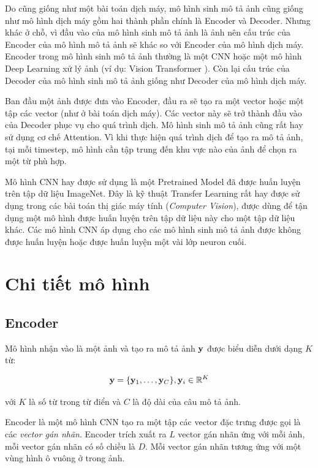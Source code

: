 \documentclass[14pt, a4paper]{article}
\numberwithin{equation}{section}
\numberwithin{algorithm}{section}
\numberwithin{figure}{section}
\numberwithin{table}{section}
\numberwithin{dl}{section}
\numberwithin{md}{section}
\numberwithin{bd}{section}
\numberwithin{dn}{section}
\numberwithin{hq}{section}
\begin{document}
    Do cũng giống như một bài toán dịch máy, mô hình sinh mô tả ảnh cũng giống như mô hình dịch máy gồm hai thành phần chính là Encoder và Decoder.
    Nhưng khác ở chỗ, vì đầu vào của mô hình sinh mô tả ảnh là ảnh nên cấu trúc của Encoder của mô hình mô tả ảnh sẽ khác so với Encoder của mô hình dịch máy.
    Encoder trong mô hình sinh mô tả ảnh thường là một CNN hoặc một mô hình Deep Learning xử lý ảnh (ví dụ: Vision Transformer \cite{dosovitskiy2020image}).
    Còn lại cấu trúc của Decoder của mô hình sinh mô tả ảnh giống như Decoder của mô hình dịch máy.

    Ban đầu một ảnh được đưa vào Encoder, đầu ra sẽ tạo ra một vector hoặc một tập các vector (như ở bài toán dịch máy).
    Các vector này sẽ trở thành đầu vào của Decoder phục vụ cho quá trình dịch.
    Mô hình sinh mô tả ảnh cũng rất hay sử dụng cơ chế Attention. 
    Vì khi thực hiện quá trình dịch để tạo ra mô tả ảnh, tại mỗi timestep, mô hình cần tập trung đến khu vực nào của ảnh để chọn ra một từ phù hợp.

    Mô hình CNN hay được sử dụng là một Pretrained Model đã được huấn luyện trên tập dữ liệu ImageNet. 
    Đây là kỹ thuật Transfer Learning rất hay được sử dụng trong các bài toán thị giác máy tính (\textit{Computer Vision}), được dùng để tận dụng một mô hình được huấn luyện trên tập dữ liệu này cho một tập dữ liệu khác.
    Các mô hình CNN áp dụng cho các mô hình sinh mô tả ảnh được không được huấn luyện hoặc được huấn luyện một vài lớp neuron cuối.

    \section{Chi tiết mô hình}

    \subsection{Encoder}

    Mô hình nhận vào là một ảnh và tạo ra mô tả ảnh $\bold{y}$ được biểu diễn dưới dạng $K$ từ:

    \begin{equation}
        \bold{y} = \lbrace \bold{y}_1, \dots, \bold{y}_C \rbrace, \bold{y}_i \in \mathbb{R}^K
    \end{equation}

    với $K$ là số từ trong từ điển và $C$ là độ dài của câu mô tả ảnh.
    
    Encoder là một mô hình CNN tạo ra một tập các vector đặc trưng được gọi là các \textit{vector gán nhãn}.
    Encoder trích xuất ra $L$ vector gán nhãn ứng với mỗi ảnh, mỗi vector gán nhãn có số chiều là $D$.
    Mỗi vector gán nhãn tương ứng với một vùng hình ô vuông ở trong ảnh.
\end{document}
